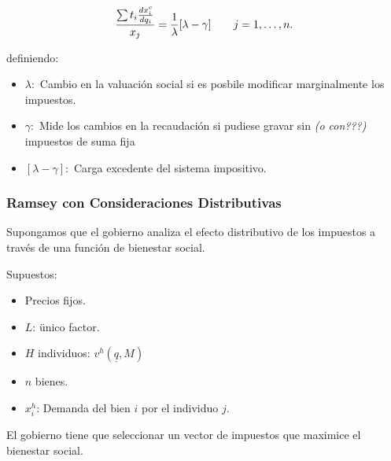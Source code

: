 $${\sum t_i \frac{dx_i^{c}}{dq_i} \over x_j}=\frac{1}{\lambda}[\lambda - \gamma] \quad \quad j=1,\ldots,n.$$

definiendo:
\begin{itemize}
	\item $\lambda:$ Cambio en la valuación social si es posbile modificar marginalmente los impuestos.
	\item $\gamma:$ Mide los cambios en la recaudación si pudiese gravar sin \emph{(o con???) }impuestos de suma fija
	\item $[\lambda-\gamma]:$ Carga excedente del sistema impositivo.
\end{itemize}

\subsubsection{Ramsey con Consideraciones Distributivas}
Supongamos que el gobierno analiza el efecto distributivo de los impuestos a través de una función de bienestar social.

Supuestos:
\begin{itemize}
	\item Precios fijos.
	\item $L$: ünico factor.
	\item $H$ individuos: $v^h(\underline{q},M)$
	\item $n$ bienes.
	\item $x_i^h$: Demanda del bien $i$ por el individuo $j$.
\end{itemize}

El gobierno tiene que seleccionar un vector de impuestos que maximice el bienestar social.

